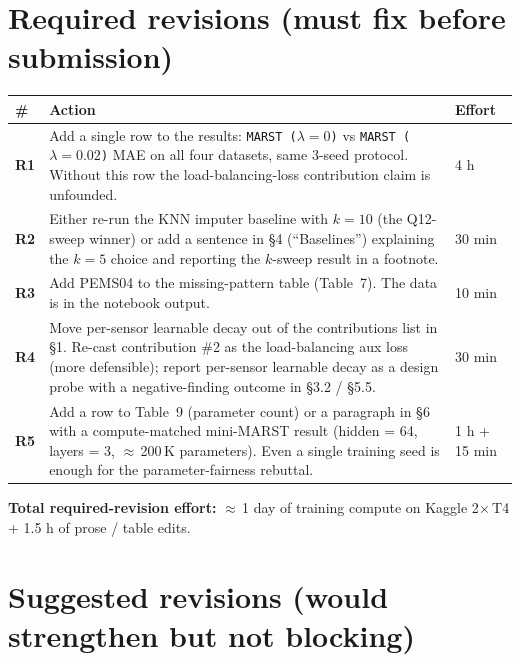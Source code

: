 \documentclass[11pt]{article}
\begin{document}
\section{Required revisions (must fix before submission)}

\begin{tabularx}{\linewidth}{@{}lXl@{}}
\toprule
\textbf{\#} & \textbf{Action} & \textbf{Effort} \\
\midrule
\textbf{R1} & Add a single row to the results:
              \texttt{MARST ($\lambda = 0$)} vs
              \texttt{MARST ($\lambda = 0.02$)} MAE on all four
              datasets, same 3-seed protocol.  Without this row the
              load-balancing-loss contribution claim is unfounded.
              & 4 h \\[4pt]
\textbf{R2} & Either re-run the KNN imputer baseline with $k = 10$ (the
              Q12-sweep winner) or add a sentence in \S4 (``Baselines'')
              explaining the $k = 5$ choice and reporting the
              $k$-sweep result in a footnote.
              & 30 min \\[4pt]
\textbf{R3} & Add PEMS04 to the missing-pattern table (Table~7).  The
              data is in the notebook output.
              & 10 min \\[4pt]
\textbf{R4} & Move per-sensor learnable decay out of the contributions
              list in \S1.  Re-cast contribution \#2 as the
              load-balancing aux loss (more defensible); report
              per-sensor learnable decay as a design probe with a
              negative-finding outcome in \S3.2 / \S5.5.
              & 30 min \\[4pt]
\textbf{R5} & Add a row to Table~9 (parameter count) or a paragraph in
              \S6 with a compute-matched mini-MARST result (hidden =
              64, layers = 3, $\approx$\,200\,K parameters).  Even a
              single training seed is enough for the
              parameter-fairness rebuttal.
              & 1 h + 15 min \\
\bottomrule
\end{tabularx}

\medskip
\noindent\textbf{Total required-revision effort:} $\approx$\,1 day of
training compute on Kaggle 2$\times$\,T4 + 1.5 h of prose / table edits.

\section{Suggested revisions (would strengthen but not blocking)}
\end{document}
